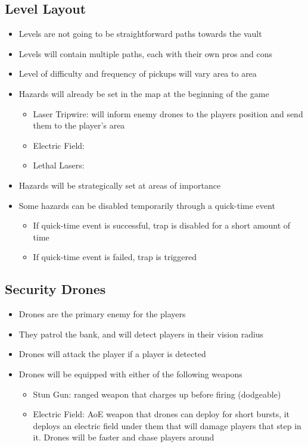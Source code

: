 \documentclass[14pt]{report}
\begin{document}
\subsection{Level Layout}
\begin{itemize}
    \item Levels are not going to be straightforward paths towards the vault
    \item Levels will contain multiple paths, each with their own pros and cons
    \item Level of difficulty and frequency of pickups will vary area to area
    \item Hazards will already be set in the map at the beginning of the game
    \begin{itemize}
        \item Laser Tripwire: will inform enemy drones to the players position and send them to the player's area
        \item Electric Field: 
        \item Lethal Lasers: 
    \end{itemize}
    \item Hazards will be strategically set at areas of importance
    \item Some hazards can be disabled temporarily through a quick-time event
    \begin{itemize}
        \item If quick-time event is successful, trap is disabled for a short amount of time
        \item If quick-time event is failed, trap is triggered
    \end{itemize}
\end{itemize}

\subsection{Security Drones}
\begin{itemize}
    \item Drones are the primary enemy for the players
    \item They patrol the bank, and will detect players in their vision radius
    \item Drones will attack the player if a player is detected
    \item Drones will be equipped with either of the following weapons
    \begin{itemize}
        \item Stun Gun: ranged weapon that charges up before firing (dodgeable)
        \item Electric Field: AoE weapon that drones can deploy for short bursts, it deploys an electric field under them that will damage players that step in it. Drones will be faster and chase players around
    \end{itemize}
\end{itemize}
\end{document}
